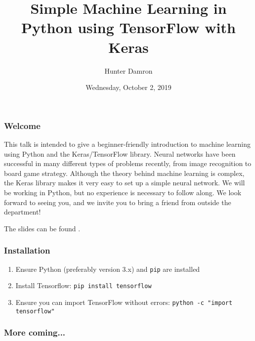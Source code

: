 \documentclass{beamer}
\title{Simple Machine Learning in Python using TensorFlow with Keras}
\author{Hunter Damron}
\date{Wednesday, October 2, 2019}
\institute[UofSC ACM]{Association for Computing Machinery -- University of South Carolina}
\begin{document}
	\maketitle
	\begin{frame}
		\frametitle{Welcome}
		This talk is intended to give a beginner-friendly introduction to machine learning using Python and the Keras/TensorFlow library. Neural networks have been successful in many different types of problems recently, from image recognition to board game strategy. Although the theory behind machine learning is complex, the Keras library makes it very easy to set up a simple neural network. We will be working in Python, but no experience is necessary to follow along. We look forward to seeing you, and we invite you to bring a friend from outside the department!

		The slides can be found \href{https://github.com/hdamron17/ACM_Machine_Learning_Talk/releases/}{\color{blue}{here}}.
	\end{frame}
	\begin{frame}
		\frametitle{Installation}
		\begin{enumerate}
			\item Ensure Python (preferably version 3.x) and \lstinline|pip| are installed
			\item Install Tensorflow: \lstinline|pip install tensorflow|
			\item Ensure you can import TensorFlow without errors: \lstinline|python -c "import tensorflow"|
		\end{enumerate}
	\end{frame}
	\begin{frame}
		\frametitle{More coming...}
	\end{frame}
\end{document}
